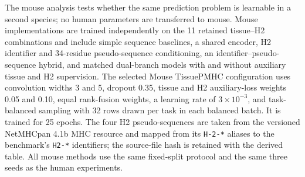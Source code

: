 The mouse analysis tests whether the same prediction problem is learnable in a second species; no human parameters are transferred to mouse. Mouse implementations are trained independently on the 11 retained tissue--H2 combinations and include simple sequence baselines, a shared encoder, H2 identifier and 34-residue pseudo-sequence conditioning, an identifier--pseudo-sequence hybrid, and matched dual-branch models with and without auxiliary tissue and H2 supervision. The selected Mouse TissuePMHC configuration uses convolution widths 3 and 5, dropout 0.35, tissue and H2 auxiliary-loss weights 0.05 and 0.10, equal rank-fusion weights, a learning rate of $3\times10^{-3}$, and task-balanced sampling with 32 rows drawn per task in each balanced batch. It is trained for 25 epochs. The four H2 pseudo-sequences are taken from the versioned NetMHCpan 4.1b MHC resource \cite{reynisson2020netmhcpan} and mapped from its \texttt{H-2-*} aliases to the benchmark's \texttt{H2-*} identifiers; the source-file hash is retained with the derived table. All mouse methods use the same fixed-split protocol and the same three seeds as the human experiments.
